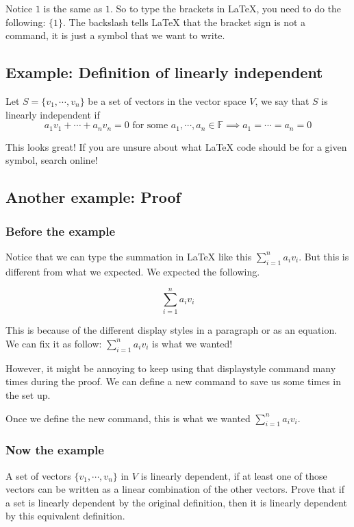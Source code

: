 \documentclass{article}
\newcommand{\Sum}{\displaystyle\sum} %
\begin{document}
Notice ${1}$ is the same as $1$. So to type the brackets in LaTeX, you need to do the following: $\{ 1 \}$. The backslash tells LaTeX that the bracket sign is not a command, it is just a symbol that we want to write.

\subsection{Example: Definition of linearly independent}
Let $S = \{ v_1, \cdots , v_n \}$ be a set of vectors in the vector space $V$, we say that $S$ is linearly independent if
$$
a_1 v_1 + \cdots + a_n v_n = 0 \text{ for some } a_1, \cdots, a_n \in \mathbb{F} \implies a_1 = \cdots = a_n = 0
$$

This looks great! If you are unsure about what LaTeX code should be for a given symbol, search online!

\subsection{Another example: Proof}
\subsubsection{Before the example}
Notice that we can type the summation in LaTeX like this
$\sum_{i=1}^{n} a_i v_i$. But this is different from what we expected. We expected the following.

$$
\sum_{i=1}^{n} a_i v_i
$$

This is because of the different display styles in a paragraph or as an equation. We can fix it as follow: $\displaystyle\sum_{i=1}^{n} a_iv_i$
is what we wanted!

However, it might be annoying to keep using that displaystyle command many times during the proof. We can define a new command to save us some times in the set up.

Once we define the new command, this is what we wanted
$\Sum_{i=1}^{n} a_i v_i$.

\subsubsection{Now the example}
A set of vectors $\{ v_1, \cdots, v_n \}$ in $V$ is linearly dependent, if at least one of those vectors can be written as a linear combination of the other vectors. Prove that if a set is linearly dependent by the original definition, then it is linearly dependent by this equivalent definition.
\end{document}
